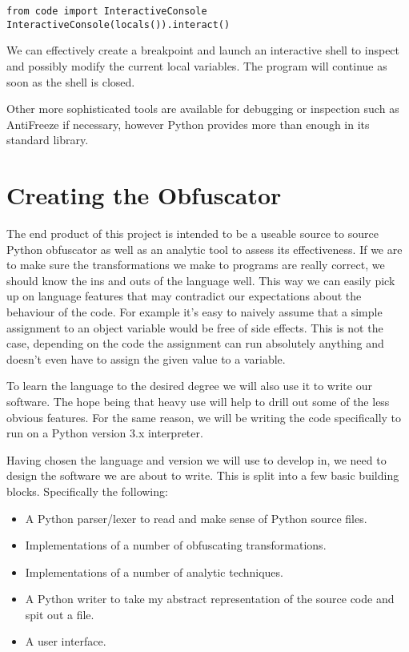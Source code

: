 \documentclass{report}
\begin{document}
\begin{lstlisting}
from code import InteractiveConsole
InteractiveConsole(locals()).interact()
\end{lstlisting}

We can effectively create a breakpoint and launch an interactive shell to inspect and possibly modify the current local
variables. The program will continue as soon as the shell is closed.

Other more sophisticated tools are available for debugging or inspection such as AntiFreeze \cite{pirates} if necessary,
however Python provides more than enough in its standard library.

\section{Creating the Obfuscator}

The end product of this project is intended to be a useable source to source Python obfuscator as well as an analytic tool
to assess its effectiveness. If we are to make sure the transformations we make to programs are really correct, we should
know the ins and outs of the language well. This way we can easily pick up on language features that may contradict our
expectations about the behaviour of the code. For example it's easy to naively assume that a simple assignment to an object
variable would be free of side effects. This is not the case, depending on the code the assignment can run absolutely
anything \cite{pyprop} and doesn't even have to assign the given value to a variable.

To learn the language to the desired degree we will also use it to write our software. The hope being that heavy use will help to
drill out some of the less obvious features. For the same reason, we will be writing the code specifically to run on a Python version 3.x
interpreter.

Having chosen the language and version we will use to develop in, we need to design the software we are about to write. This is split into a few basic building
blocks. Specifically the following:

\begin{itemize}
\item A Python parser/lexer to read and make sense of Python source files.
\item Implementations of a number of obfuscating transformations.
\item Implementations of a number of analytic techniques.
\item A Python writer to take my abstract representation of the source code and spit out a file.
\item A user interface.
\end{itemize}
\end{document}
